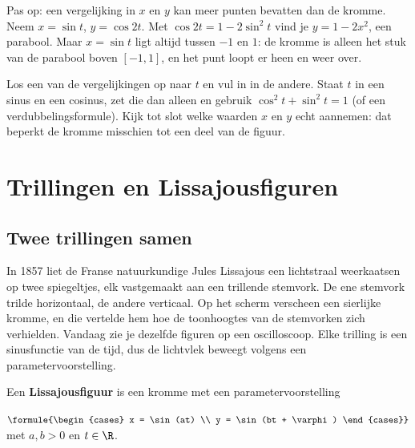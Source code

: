 Pas op: een vergelijking in $x$ en $y$ kan meer punten bevatten dan de kromme. Neem $x = \sin t$, $y = \cos 2t$. Met $\cos 2t = 1 - 2\sin^2 t$ vind je $y = 1 - 2x^2$, een parabool. Maar $x = \sin t$ ligt altijd tussen $-1$ en $1$: de kromme is alleen het stuk van de parabool boven $[-1, 1]$, en het punt loopt er heen en weer over.

\begin{werkwijze}
Los een van de vergelijkingen op naar $t$ en vul in in de andere. Staat $t$ in een sinus en een cosinus, zet die dan alleen en gebruik $\cos^2 t + \sin^2 t = 1$ (of een verdubbelingsformule). Kijk tot slot welke waarden $x$ en $y$ echt aannemen: dat beperkt de kromme misschien tot een deel van de figuur.
\end{werkwijze}


\begin{oefeningen}

\end{oefeningen}

\section{Trillingen en Lissajousfiguren}

\subsection{Twee trillingen samen}

In 1857 liet de Franse natuurkundige Jules Lissajous een lichtstraal weerkaatsen op twee spiegeltjes, elk vastgemaakt aan een trillende stemvork. De ene stemvork trilde horizontaal, de andere verticaal. Op het scherm verscheen een sierlijke kromme, en die vertelde hem hoe de toonhoogtes van de stemvorken zich verhielden. Vandaag zie je dezelfde figuren op een oscilloscoop. Elke trilling is een sinusfunctie van de tijd, dus de lichtvlek beweegt volgens een parametervoorstelling.

\begin{theorie}
Een \textbf{\textcolor{accent}{Lissajousfiguur}} is een kromme met een parametervoorstelling

\vspace{1mm}
\qquad $\formule{\begin{cases} x = \sin(at) \\ y = \sin(bt + \varphi) \end{cases}}$ \quad met $a, b > 0$ en $t \in \R$.
\end{theorie}

